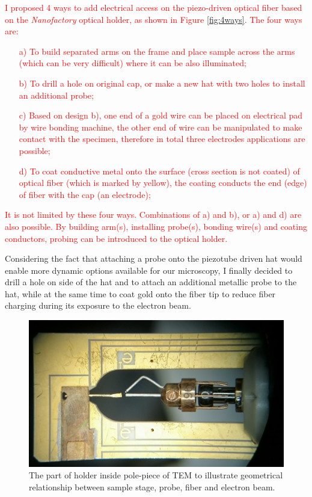 \textcolor{red}{
I proposed 4 ways to add electrical access on the piezo-driven optical fiber based on the \textit{Nanofactory} optical holder, as shown in Figure \ref{fig:4ways}. 
The four ways are: \\
\begin{itemize}
	\item[a)] To build separated arms on the frame and place sample across the arms (which can be very difficult) where it can be also illuminated; 
	\item[b)] To drill a hole on original cap, or make a new hat with two holes to install an additional probe; 
	\item[c)] Based on design b), one end of a gold wire can be placed on electrical pad by wire bonding machine, the other end of wire can be manipulated to make contact with the specimen, therefore in total three electrodes applications are possible; 
	\item[d)] To coat conductive metal onto the surface (cross section is not coated) of optical fiber (which is marked by yellow), the coating conducts the end (edge) of fiber with the cap (an electrode); 
\end{itemize}
It is not limited by these four ways. Combinations of a) and b), or a) and d) are also possible. By building arm(s), installing probe(s), bonding wire(s) and coating conductors, probing can be introduced to the optical holder. 
}


Considering the fact that attaching a probe onto the piezotube driven hat would enable more dynamic options available for our microscopy, I finally decided to drill a hole on side of the hat and to attach an additional metallic probe to the hat, while at the same time to coat gold onto the fiber tip to reduce fiber charging during its exposure to the electron beam. 

\begin{figure}  
\centering
\includegraphics[width=\textwidth]{figures/figure2_holderframe}
\caption[Inner part of the holder]{The part of holder inside pole-piece of TEM to illustrate geometrical relationship between sample stage, probe, fiber and electron beam.
\label{fig:2_frame}}
\end{figure}

